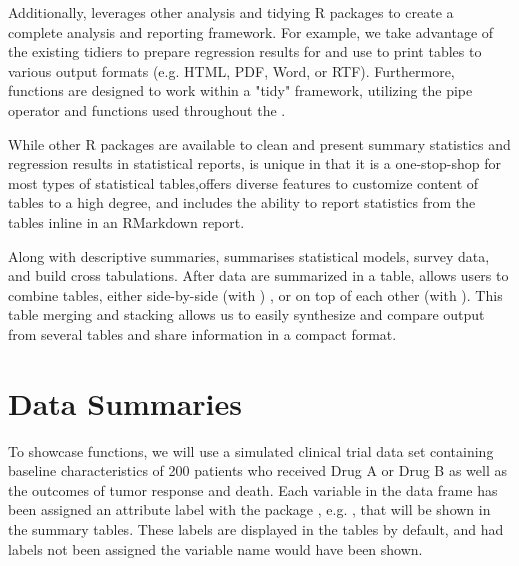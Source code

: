 Additionally,  leverages other analysis and tidying R packages to create a complete analysis and reporting framework.
For example, we take advantage of the existing  tidiers to prepare regression results for  and use  \citep{gt} to print  tables to various output formats (e.g. HTML, PDF, Word, or RTF).
Furthermore,  functions are designed to work within a "tidy" framework, utilizing the  pipe operator and  \citep{tidyselect} functions used throughout the  \citep{tidyverse}.

While other R packages are available to clean and present summary statistics and regression results in statistical reports,  is unique in that it is a one-stop-shop for most types of statistical tables,offers diverse features to customize content of tables to a high degree, and includes the ability to report statistics from the tables inline in an RMarkdown report.

Along with descriptive summaries,  summarises statistical models, survey data, and build cross tabulations. 
After data are summarized in a table,  allows users to combine tables, either side-by-side (with ) , or on top of each other (with ). 
This table merging and stacking allows us to easily synthesize and compare output from several tables and share information in a compact format.   

\section{Data Summaries}

To showcase  functions, we will use a simulated clinical trial data set containing baseline characteristics of 200 patients who received Drug A or Drug B as well as the outcomes of tumor response and death.
Each variable in the data frame has been assigned an attribute label with the  package \citep{labelled}, e.g. , that will be shown in the summary tables. 
These labels are displayed in the  tables by default, and had labels not been assigned the variable name would have been shown.


